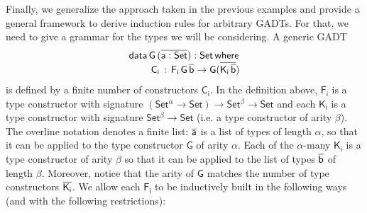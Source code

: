 \documentclass[acmsmall,screen,review,anonymous]{acmart}
\theoremstyle{definition}
\begin{document}
Finally, we generalize the approach taken in the previous examples
and provide a general framework to derive induction rules for arbitrary GADTs.
For that, we need to give a grammar for the types we will be considering.
A generic GADT
\begin{equation*}
\begin{array}{l}
\mathsf{data\, G\,(\overline{a : Set}) : Set\,where}\\
\mathsf{\;\;\;\;\;\;\;\;C_i\, :\, F_i\,G\,\overline{b} \to G (\overline{K_i\,\overline{b}})}
\end{array}
\end{equation*}
is defined by a finite number of constructors $\mathsf{C_i}$.
In the definition above, $\mathsf{F_i}$ is a type constructor with signature $\mathsf{(Set^{\alpha} \to Set) \to Set^{\beta} \to Set}$
and each $\mathsf{K_i}$ is a type constructor with signature $\mathsf{Set^{\beta} \to Set}$
(i.e. a type constructor of arity $\mathsf{\beta}$).
The overline notation denotes a finite list:
$\mathsf{\overline{a}}$ is a list of types of length $\mathsf{\alpha}$,
so that it can be applied to the type constructor $\mathsf{G}$ of arity $\mathsf{\alpha}$.
Each of the $\mathsf{\alpha}$-many $\mathsf{K_i}$ is a type constructor of arity $\mathsf{\beta}$
so that it can be applied to the list of types $\mathsf{\overline{b}}$ of length $\mathsf{\beta}$.
Moreover, notice that the arity of $\mathsf{G}$ matches the number of type constructors $\mathsf{\overline{K_i}}$.
We allow each $\mathsf{F_i}$ to be inductively built in the following ways (and with the following restrictions):
\end{document}
